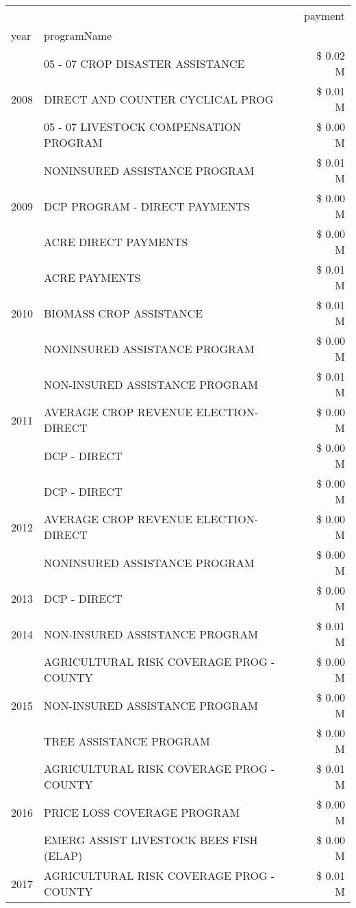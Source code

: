 \begin{tabular}{llr}
\toprule
 &  & payment \\
year & programName &  \\
\midrule
\multirow[t]{3}{*}{2008} & 05 - 07 CROP DISASTER ASSISTANCE & \$ 0.02 M \\
 & DIRECT AND COUNTER CYCLICAL PROG & \$ 0.01 M \\
 & 05 - 07 LIVESTOCK COMPENSATION PROGRAM & \$ 0.00 M \\
\cline{1-3}
\multirow[t]{3}{*}{2009} & NONINSURED ASSISTANCE PROGRAM & \$ 0.01 M \\
 & DCP PROGRAM - DIRECT PAYMENTS & \$ 0.00 M \\
 & ACRE DIRECT PAYMENTS & \$ 0.00 M \\
\cline{1-3}
\multirow[t]{3}{*}{2010} & ACRE PAYMENTS & \$ 0.01 M \\
 & BIOMASS CROP ASSISTANCE & \$ 0.01 M \\
 & NONINSURED ASSISTANCE PROGRAM & \$ 0.00 M \\
\cline{1-3}
\multirow[t]{3}{*}{2011} & NON-INSURED ASSISTANCE PROGRAM & \$ 0.01 M \\
 & AVERAGE CROP REVENUE ELECTION-DIRECT & \$ 0.00 M \\
 & DCP - DIRECT & \$ 0.00 M \\
\cline{1-3}
\multirow[t]{3}{*}{2012} & DCP - DIRECT & \$ 0.00 M \\
 & AVERAGE CROP REVENUE ELECTION-DIRECT & \$ 0.00 M \\
 & NONINSURED ASSISTANCE PROGRAM & \$ 0.00 M \\
\cline{1-3}
2013 & DCP - DIRECT & \$ 0.00 M \\
\cline{1-3}
2014 & NON-INSURED ASSISTANCE PROGRAM & \$ 0.01 M \\
\cline{1-3}
\multirow[t]{3}{*}{2015} & AGRICULTURAL RISK COVERAGE PROG - COUNTY & \$ 0.00 M \\
 & NON-INSURED ASSISTANCE PROGRAM & \$ 0.00 M \\
 & TREE ASSISTANCE PROGRAM & \$ 0.00 M \\
\cline{1-3}
\multirow[t]{3}{*}{2016} & AGRICULTURAL RISK COVERAGE PROG - COUNTY & \$ 0.01 M \\
 & PRICE LOSS COVERAGE PROGRAM & \$ 0.00 M \\
 & EMERG ASSIST LIVESTOCK BEES FISH (ELAP) & \$ 0.00 M \\
\cline{1-3}
\multirow[t]{2}{*}{2017} & AGRICULTURAL RISK COVERAGE PROG - COUNTY & \$ 0.01 M \\

\end{tabular}
